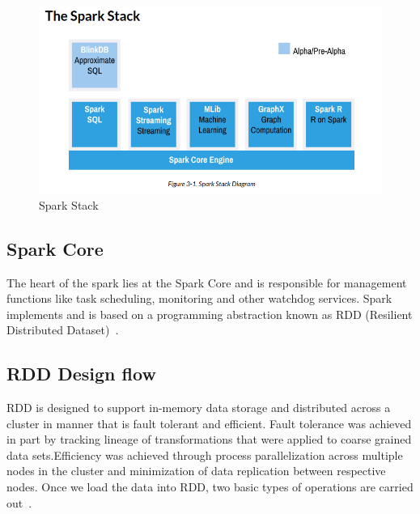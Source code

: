 


\begin{figure}[!ht]
  \centering\includegraphics[width=\columnwidth]{images/spark-stack.png}
   \caption{Spark Stack 
   ~\cite{hid-sp18-410-spark-architecture}}\label{fig:spark-stack}
\end{figure}




\subsection{Spark Core}

The heart of the spark lies at the Spark Core and is responsible for management 
functions like task scheduling, monitoring and other watchdog services. 
Spark implements and is based on a programming abstraction known as 
RDD (Resilient Distributed Dataset)~\cite{hid-sp18-410-spark-architecture}.



\subsection{RDD Design flow}

RDD is designed to support in-memory data storage and distributed across a 
cluster in manner that is   fault tolerant and efficient. Fault tolerance was 
achieved in part by tracking lineage of transformations that were applied to 
coarse grained data sets.Efficiency was achieved through process parallelization
 across multiple nodes in the cluster and minimization of data replication 
 between respective nodes.
Once we load the data into RDD, two basic types of operations are carried out~\cite{hid-sp18-410-spark-RDD}.

